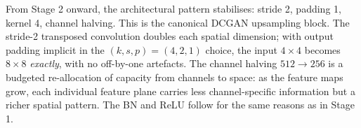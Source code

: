 
From Stage 2 onward, the architectural pattern stabilises: stride 2,
padding 1, kernel 4, channel halving. This is the canonical DCGAN
upsampling block. The stride-2 transposed convolution doubles each
spatial dimension; with output padding implicit in the
$(k, s, p) = (4, 2, 1)$ choice, the input $4 \times 4$ becomes
$8 \times 8$ \emph{exactly}, with no off-by-one artefacts. The channel
halving $512 \to 256$ is a budgeted re-allocation of capacity from
channels to space: as the feature maps grow, each individual feature
plane carries less channel-specific information but a richer spatial
pattern. The BN and ReLU follow for the same reasons as in Stage 1.
